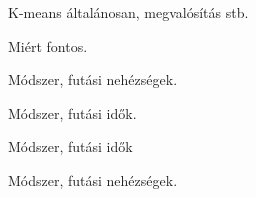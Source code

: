 
K-means általánosan, megvalósítás stb.


Miért fontos. \cite{tomatoleaf}


Módszer, futási nehézségek.


Módszer, futási idők.


Módszer, futási idők


Módszer, futási nehézségek.